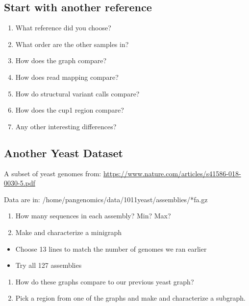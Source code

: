 \documentclass[
]{book}
\providecommand{\tightlist}{%
  \setlength{\itemsep}{0pt}\setlength{\parskip}{0pt}}
\begin{document}
\hypertarget{start-with-another-reference}{%
\subsection*{Start with another reference}\label{start-with-another-reference}}

\begin{enumerate}
\def\labelenumi{\arabic{enumi}.}
\tightlist
\item
  What reference did you choose?
\item
  What order are the other samples in?
\item
  How does the graph compare?
\item
  How does read mapping compare?
\item
  How do structural variant calls compare?
\item
  How does the cup1 region compare?
\item
  Any other interesting differences?
\end{enumerate}

\hypertarget{another-yeast-dataset}{%
\subsection*{Another Yeast Dataset}\label{another-yeast-dataset}}

A subset of yeast genomes from: \url{https://www.nature.com/articles/s41586-018-0030-5.pdf}

Data are in: /home/pangenomics/data/1011yeast/assemblies/*fa.gz

\begin{enumerate}
\def\labelenumi{\arabic{enumi}.}
\tightlist
\item
  How many sequences in each assembly? Min? Max?
\item
  Make and characterize a minigraph
\end{enumerate}

\begin{itemize}
\tightlist
\item
  Choose 13 lines to match the number of genomes we ran earlier\\
\item
  Try all 127 assemblies\\
\end{itemize}

\begin{enumerate}
\def\labelenumi{\arabic{enumi}.}
\setcounter{enumi}{2}
\tightlist
\item
  How do these graphs compare to our previous yeast graph?
\item
  Pick a region from one of the graphs and make and characterize a subgraph.
\end{enumerate}
\end{document}
